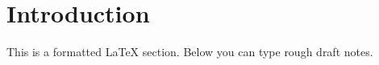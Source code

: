 \documentclass{article}
\begin{document}
\section{Introduction}

This is a formatted LaTeX section. Below you can type rough draft notes.

\end{document}
